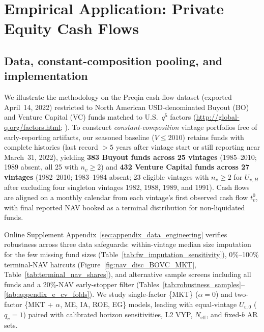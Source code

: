 \documentclass[12pt]{article}
\begin{document}
\section{Empirical Application: Private Equity Cash Flows}
\label{sec:empirical_results_bovc}

\subsection{Data, constant-composition pooling, and implementation}
\label{sec:empirical_data}

We illustrate the methodology on the Preqin cash-flow dataset (exported April~14, 2022) restricted to North American USD-denominated Buyout (BO) and Venture Capital (VC) funds matched to U.S.\ $q^5$ factors (\url{http://global-q.org/factors.html}; \citealp{HXZ15,hou2021augmented}).
To construct \emph{constant-composition} vintage portfolios free of early-reporting artifacts, our seasoned baseline ($V \le 2010$) retains funds with complete histories (last record $> 5$ years after vintage start or still reporting near March~31, 2022), yielding \textbf{383 Buyout funds across 25 vintages} (1985--2010; 1989 absent, all 25 with $n_v \ge 2$) and \textbf{432 Venture Capital funds across 27 vintages} (1982--2010; 1983--1984 absent; 23 eligible vintages with $n_v \ge 2$ for $U_{v,H}$ after excluding four singleton vintages 1982, 1988, 1989, and 1991).
Cash flows are aligned on a monthly calendar from each vintage's first observed cash flow $t_v^0$, with final reported NAV booked as a terminal distribution for non-liquidated funds.

Online Supplement Appendix~\ref{sec:appendix_data_engineering} verifies robustness across three data safeguards: within-vintage median size imputation for the few missing fund sizes (Table~\ref{tab:fw_imputation_sensitivity}), 0\%--100\% terminal-NAV haircuts (Figure~\ref{fig:nav_disc_BOVC_MKT}, Table~\ref{tab:terminal_nav_shares}), and alternative sample screens including all funds and a 20\%-NAV early-stopper filter (Tables~\ref{tab:robustness_samples}--\ref{tab:appendix_e_cv_folds}).
We study single-factor \{MKT\} ($\alpha = 0$) and two-factor \{MKT + $\alpha$, ME, IA, ROE, EG\} models, leading with equal-vintage $U_{v,0}$ ($q_v=1$) paired with calibrated horizon sensitivities, L2 VYP, $N_{\mathrm{eff}}$, and fixed-$b$ AR sets.
\end{document}
